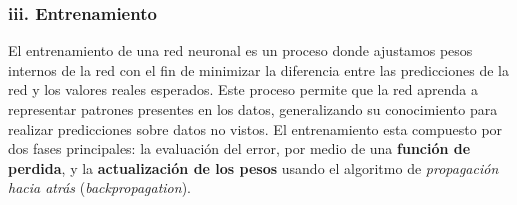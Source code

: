 \documentclass[11pt]{article} %
\begin{document}
\subsubsection*{iii. Entrenamiento}
\vspace{3pt}
El entrenamiento de una red neuronal es un proceso donde ajustamos pesos internos de la red con el fin de minimizar la diferencia entre las predicciones de la red y los valores reales esperados. Este proceso permite que la red aprenda a representar patrones presentes en los datos, generalizando su conocimiento para realizar predicciones sobre datos no vistos. El entrenamiento esta compuesto por dos fases principales: la evaluación del error, por medio de una \textbf{función de perdida}, y la \textbf{actualización de los pesos} usando el algoritmo de \textit{propagación hacia atrás} (\textit{backpropagation}).
\end{document}
